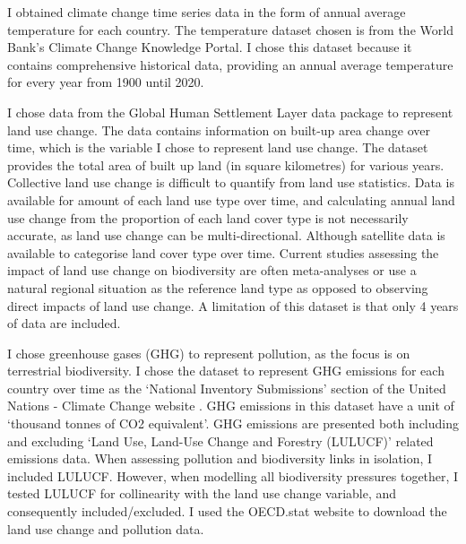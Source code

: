 \documentclass[11pt, a4paper, titlepage]{article}
\begin{document}
	I obtained climate change time series data in the form of annual average temperature for each country. The temperature dataset chosen is from the World Bank's Climate Change Knowledge Portal. I chose this dataset because it contains comprehensive historical data, providing an annual average temperature for every year from 1900 until 2020. 
	
	I chose data from the Global Human Settlement Layer data package \citep{JRC117104} to represent land use change. The data contains information on built-up area change over time, which is the variable I chose to represent land use change. The dataset provides the total area of built up land (in square kilometres) for various years. Collective land use change is difficult to quantify from land use statistics. Data is available for amount of each land use type over time, and calculating annual land use change from the proportion of each land cover type is not necessarily accurate, as land use change can be multi-directional. Although satellite data is available to categorise land cover type over time. Current studies assessing the impact of land use change on biodiversity are often meta-analyses or use a natural regional situation as the reference land type \citep{de2013land} as opposed to observing direct impacts of land use change. A limitation of this dataset is that only 4 years of data are included. 
	
	I chose greenhouse gases (GHG) to represent pollution, as the focus is on terrestrial biodiversity. I chose the dataset to represent GHG emissions for each country over time as the `National Inventory Submissions' section of the United Nations - Climate Change website \citep{UN2022}. GHG emissions in this dataset have a unit of `thousand tonnes of CO2 equivalent'. GHG emissions are presented both including and excluding `Land Use, Land-Use Change and Forestry (LULUCF)' related emissions data. When assessing pollution and biodiversity links in isolation, I included LULUCF. However, when modelling all biodiversity pressures together, I tested LULUCF for collinearity with the land use change variable, and consequently included/excluded. I used the OECD.stat website to download the land use change and pollution data. 
	
\end{document}
